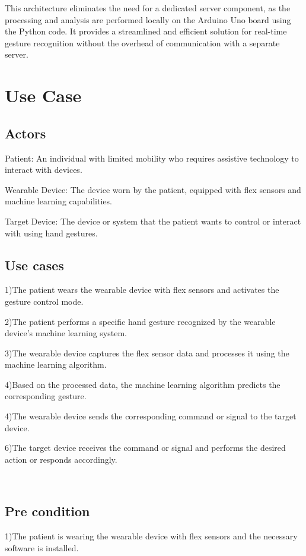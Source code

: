 \documentclass[a4paper,12pt,oneside]{report}
\begin{document}
This architecture eliminates the need for a dedicated server component, as the processing and analysis are performed locally on the Arduino Uno board using the Python code. It provides a streamlined and efficient solution for real-time gesture recognition without the overhead of communication with a separate server.
  
	
\section{Use Case}
\subsection{Actors}
\par
Patient: An individual with limited mobility who requires assistive technology to interact with devices.

\par
Wearable Device: The device worn by the patient, equipped with flex sensors and machine learning capabilities.
\par
Target Device: The device or system that the patient wants to control or interact with using hand gestures.
\\
\subsection{Use cases}
\par
1)The patient wears the wearable device with flex sensors and activates the gesture control mode.

\par
2)The patient performs a specific hand gesture recognized by the wearable device's machine learning system.

\par
3)The wearable device captures the flex sensor data and processes it using the machine learning algorithm.
\par
4)Based on the processed data, the machine learning algorithm predicts the corresponding gesture.
\par

4)The wearable device sends the corresponding command or signal to the target device.
\par
6)The target device receives the command or signal and performs the desired action or responds accordingly.

\\
\subsection{Pre condition}
\par
1)The patient is wearing the wearable device with flex sensors and the necessary software is installed.
\par
\end{document}
